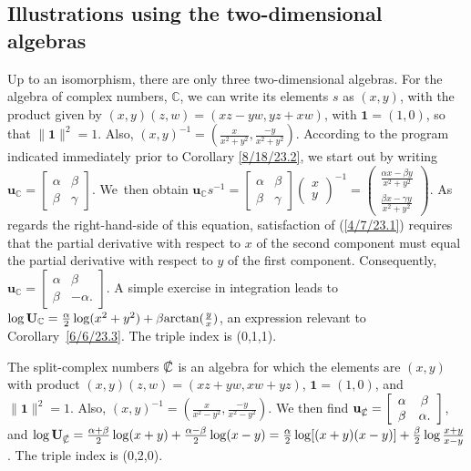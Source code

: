 \documentclass{amsart}
\numberwithin{equation}{section}
\theoremstyle{definition}
\numberwithin{theorem}{section}
\begin{document}
\subsection{Illustrations using the two-dimensional algebras}
Up to an isomorphism, there are only three two-dimensional algebras.
For the algebra of complex numbers, $\mathbb{C}$, we can write its elements $s$ as $(x,y)$, with the product given by $(x,y)(z,w) = (xz-yw, yz+xw)$, with $\mathbf{1}=(1,0)$, so that $\|\mathbf{1}\|^2=1$.  Also, $(x,y)^{-1} = (\frac{x}{x^2+y^2},\frac{-y}{x^2+y^2})$.  According to the program indicated immediately prior to Corollary \ref{8/18/23.2}, we start out by writing  $\mathbf{u}_\mathbb{C} = \left[\begin{array}{ccc}
 \alpha & \beta   \\ 
 \beta & \gamma    
\end{array}\right]$.  \mbox{We then} obtain  $\mathbf{u}_\mathbb{C}s^{-1} = \left[\begin{array}{ccc}
 \alpha & \beta   \\ 
 \beta & \gamma    
\end{array}\right]\left(\begin{array}{ccc}
x   \\ 
y   
\end{array}\right)^{-1} = \left(\begin{array}{ccc}
\frac{\alpha x - \beta y}{x^2+y^2}  \\ 
\frac{\beta x - \gamma y}{x^2+y^2} 
\end{array}\right)$.  As regards the right-hand-side of this equation, satisfaction of (\ref{4/7/23.1}) requires that the partial derivative with respect to $x$ of the second component must equal the partial derivative with respect to $y$ of the first component.  Consequently, $\mathbf{u}_{\mathbb{C}} = \left[\begin{array}{ccc}
 \alpha & \beta   \\ 
 \beta & -\alpha.    
\end{array}\right]$.  A simple exercise in integration leads to $\log  \mathbf{U}_{\mathbb{C}} = \frac{\alpha}{2}\log(x^2+y^2) + \beta{\rm arctan}(\frac{y}{x})$, an expression relevant to \mbox{Corollary \ref{6/6/23.3}}.  The triple index is (0,1,1).

The split-complex numbers $\slashed{\mathbb{C}}$ is an algebra for which the elements are  $(x,y)$ with product $(x,y)(z,w) = (xz+yw,xw+yz)$, $ \mathbf{1} = (1,0)$, and $\|\mathbf{1}\|^2 = 1$.  Also, $(x,y)^{-1} = (\frac{x}{x^2-y^2},\frac{-y}{x^2-y^2})$.  We then find $\mathbf{u}_{\slashed{\mathbb{C}}} = \left[\begin{array}{ccc}
 \alpha & \beta   \\ 
 \beta & \alpha.    
\end{array}\right]$, and $\log  \mathbf{U}_{\slashed{\mathbb{C}}} = \frac{\alpha+\beta}{2}\log(x+y) + \frac{\alpha-\beta}{2}\log(x-y) = \frac{\alpha}{2}\log[(x+
y)(x-y)] +  \frac{\beta}{2}\log \frac{x+y}{x-y}$.  The triple index is (0,2,0).
\end{document}
